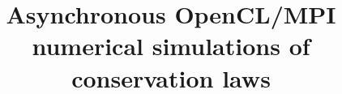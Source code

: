 \documentclass[preprint]{sig-alternate}
\begin{document}
%

\title{Asynchronous OpenCL/MPI numerical simulations of conservation laws}
%
%
%
%
%
\end{document}
